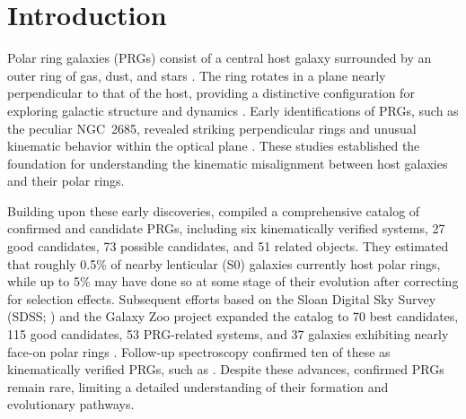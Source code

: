 \documentclass[twocolumn]{aastex631}
\begin{document}
\section{Introduction}
\label{sec:intro}
Polar ring galaxies (PRGs) consist of a central host galaxy surrounded by an outer ring of gas, dust, and stars \citep{Schweizer1983AJ.....88..909S, Varnas1987ApJ...313...69V}. The ring rotates in a plane nearly perpendicular to that of the host, providing a distinctive configuration for exploring galactic structure and dynamics \citep{Whitmore1990AJ....100.1489W, BinneyMerrifield1998gaas.book.....B}. Early identifications of PRGs, such as the peculiar NGC~2685, revealed striking perpendicular rings and unusual kinematic behavior within the optical plane \citep{Sandage1961hag..book.....S, Schechter1978AJ.....83.1360S}. These studies established the foundation for understanding the kinematic misalignment between host galaxies and their polar rings.

Building upon these early discoveries, \citet{Whitmore1990AJ....100.1489W} compiled a comprehensive catalog of confirmed and candidate PRGs, including six kinematically verified systems, 27 good candidates, 73 possible candidates, and 51 related objects. They estimated that roughly 0.5\% of nearby lenticular (S0) galaxies currently host polar rings, while up to 5\% may have done so at some stage of their evolution after correcting for selection effects. Subsequent efforts based on the Sloan Digital Sky Survey (SDSS; \citealt{York2000AJ....120.1579Y}) and the Galaxy Zoo project \citep{Lintott2008MNRAS.389.1179L} expanded the catalog to 70 best candidates, 115 good candidates, 53 PRG-related systems, and 37 galaxies exhibiting nearly face-on polar rings \citep{Moiseev2011MNRAS.418..244M}. Follow-up spectroscopy confirmed ten of these as kinematically verified PRGs, such as \citet{Moiseev2011MNRAS.418..244M, Moiseev2014ASPC..486...71M}. Despite these advances, confirmed PRGs remain rare, limiting a detailed understanding of their formation and evolutionary pathways.
\end{document}
